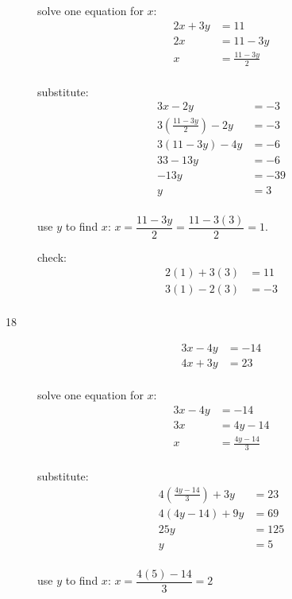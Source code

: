 \documentclass[fleqn,addpoints]{exam}
\begin{document}
\begin{description}
solve one equation for $x$:
\begin{align*}
  2x+3y &= 11 \\
  2x &= 11 - 3y \\
  x &= \frac{11 - 3y}{2} \\
\end{align*}

substitute:
\begin{align*}
  3x-2y &= -3 \\
  3 \left( \frac{11 - 3y}{2} \right) -2y &= -3 \\
  3(11-3y) - 4y &= -6 \\
  33 - 13y &= -6 \\
  -13y &= -39 \\
  y &= 3 \\
\end{align*}

use $y$ to find $x$: $x = \dfrac{11 - 3y}{2} = \dfrac{11 - 3(3)}{2} = 1$.  

\vspace{0.2 cm}
\vspace{0.2 cm}

check:
\begin{align*}
  2(1) + 3(3) &= 11 \\
  3(1) - 2(3) &= -3 \\
\end{align*}

\item[18]
\begin{align*}
  3x-4y &= -14 \\
  4x+3y &= 23 \\
\end{align*}

solve one equation for $x$:
\begin{align*}
  3x-4y &= -14 \\
  3x &= 4y-14 \\
  x &= \frac{4y-14}{3} \\
\end{align*}

substitute:
\begin{align*}
  4(\frac{4y-14}{3}) + 3y &= 23 \\
  4(4y-14) + 9y &= 69 \\
  25y &= 125 \\
   y &= 5 \\
\end{align*}

use $y$ to find $x$: $x = \dfrac{4(5) - 14}{3} = 2$


\end{description}
\end{document}
